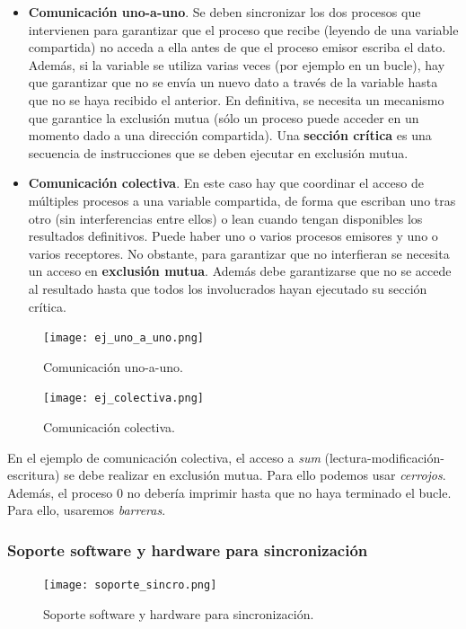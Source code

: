 \documentclass[12pt,spanish]{article}
\begin{document}
\begin{itemize}
	\item \textbf{Comunicación uno-a-uno}. Se deben sincronizar los dos procesos que intervienen para garantizar que el proceso que recibe (leyendo de una variable compartida) no acceda a ella antes de que el proceso emisor escriba el dato. Además, si la variable se utiliza varias veces (por ejemplo en un bucle), hay que garantizar que no se envía un nuevo dato a través de la variable hasta que no se haya recibido el anterior. En definitiva, se necesita un mecanismo que garantice la exclusión mutua (sólo un proceso puede acceder en un momento dado a una dirección compartida). Una \textbf{sección crítica} es una secuencia de instrucciones que se deben ejecutar en exclusión mutua.
	\item \textbf{Comunicación colectiva}. En este caso hay que coordinar el acceso de múltiples procesos a una variable compartida, de forma que escriban uno tras otro (sin interferencias entre ellos) o lean cuando tengan disponibles los resultados definitivos. Puede haber uno o varios procesos emisores y uno o varios receptores. No obstante, para garantizar que no interfieran se necesita un acceso en \textbf{exclusión mutua}. Además debe garantizarse que no se accede al resultado hasta que todos los involucrados hayan ejecutado su sección crítica.
\end{itemize}

\begin{figure}[H]
\centering
\texttt{[image: ej\_uno\_a\_uno.png]}
\caption{Comunicación uno-a-uno.}
\end{figure}

\begin{figure}[H]
\centering
\texttt{[image: ej\_colectiva.png]}
\caption{Comunicación colectiva.}
\end{figure}

En el ejemplo de comunicación colectiva, el acceso a \textit{sum} (lectura-modificación-escritura) se debe realizar en exclusión mutua. Para ello podemos usar \emph{cerrojos}. Además, el proceso 0 no debería imprimir hasta que no haya terminado el bucle. Para ello, usaremos \emph{barreras}.



\subsubsection{Soporte software y hardware para sincronización}

\begin{figure}[H]
\centering
\texttt{[image: soporte\_sincro.png]}
\caption{Soporte software y hardware para sincronización.}
\end{figure}
\end{document}
